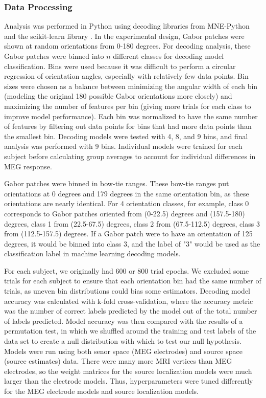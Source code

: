 \documentclass[../main.tex]{subfiles}
\begin{document}
\subsubsection*{Data Processing}
Analysis was performed in Python using decoding libraries from MNE-Python \citep{mne} and the scikit-learn library \citep{scikit-learn}. In the experimental design, Gabor patches were shown at random orientations from 0-180 degrees. For decoding analysis, these Gabor patches were binned into $n$ different classes for decoding model classification. Bins were used because it was difficult to perform a circular regression of orientation angles, especially with relatively few data points. Bin sizes were chosen as a balance between minimizing the angular width of each bin (modeling the original 180 possible Gabor orientations more closely) and maximizing the number of features per bin (giving more trials for each class to improve model performance). Each bin was normalized to have the same number of features by filtering out data points for bins that had more data points than the smallest bin. Decoding models were tested with 4, 8, and 9 bins, and final analysis was performed with 9 bins. Individual models were trained for each subject before calculating group averages to account for individual differences in MEG response.

Gabor patches were binned in bow-tie ranges. These bow-tie ranges put orientations at 0 degrees and 179 degrees in the same orientation bin, as these orientations are nearly identical. For 4 orientation classes, for example, class 0 corresponds to Gabor patches oriented from (0-22.5) degrees and (157.5-180) degrees, class 1 from (22.5-67.5) degrees, class 2 from (67.5-112.5) degrees, class 3 from (112.5-157.5) degrees. If a Gabor patch were to have an orientation of 125 degrees, it would be binned into class 3, and the label of "3" would be used as the classification label in machine learning decoding models. 

For each subject, we originally had 600 or 800 trial epochs. We excluded some trials for each subject to ensure that each orientation bin had the same number of trials, as uneven bin distributions could bias some estimators. Decoding model accuracy was calculated with k-fold cross-validation, where the accuracy metric was the number of correct labels predicted by the model out of the total number of labels predicted. Model accuracy was then compared with the results of a permutation test, in which we shuffled around the training and test labels of the data set to create a null distribution with which to test our null hypothesis. Models were run using both senor space (MEG electrodes) and source space (source estimates) data. There were many more MRI vertices than MEG electrodes, so the weight matrices for the source localization models were much larger than the electrode models. Thus, hyperparameters were tuned differently for the MEG electrode models and source localization models.
\end{document}
